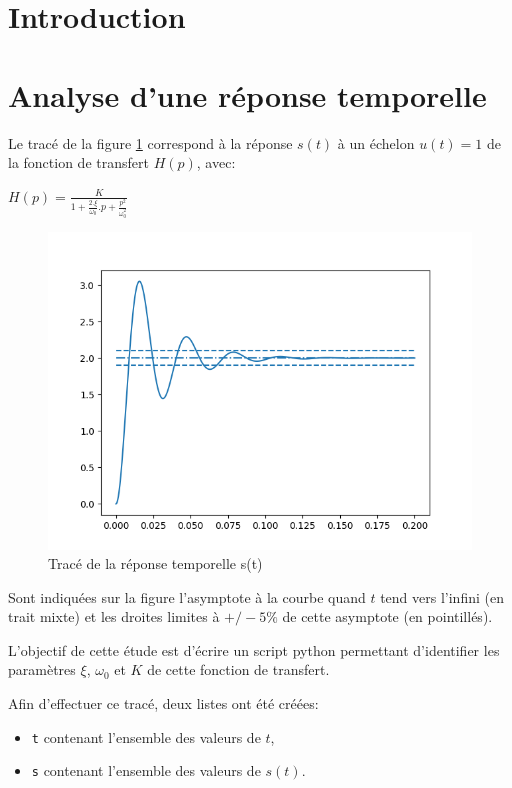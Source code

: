 

\section{Introduction}


\section{Analyse d'une réponse temporelle}

Le tracé de la figure \ref{fig01} correspond à la réponse $s(t)$ à un échelon $u(t)=1$ de la fonction de transfert $H(p)$, avec:

\begin{center}
$H(p)=\frac{K}{1+\frac{2.\xi}{\omega_0}.p+\frac{p^2}{\omega_0^2}}$
\end{center}

\vspace{-1cm}

\begin{figure}[!ht]
\centering\includegraphics[width=0.7\linewidth]{img/fig01}
\caption{Tracé de la réponse temporelle s(t)}
\label{fig01}
\end{figure}

Sont indiquées sur la figure l'asymptote à la courbe quand $t$ tend vers l'infini (en trait mixte) et les droites limites à $+/-5\%$ de cette asymptote (en pointillés).

L'objectif de cette étude est d'écrire un script python permettant d'identifier les paramètres $\xi$, $\omega_0$ et $K$ de cette fonction de transfert.

Afin d'effectuer ce tracé, deux listes ont été créées:
\begin{itemize}
 \item \verb?t? contenant l'ensemble des valeurs de $t$,
 \item \verb?s? contenant l'ensemble des valeurs de $s(t)$.
\end{itemize}

